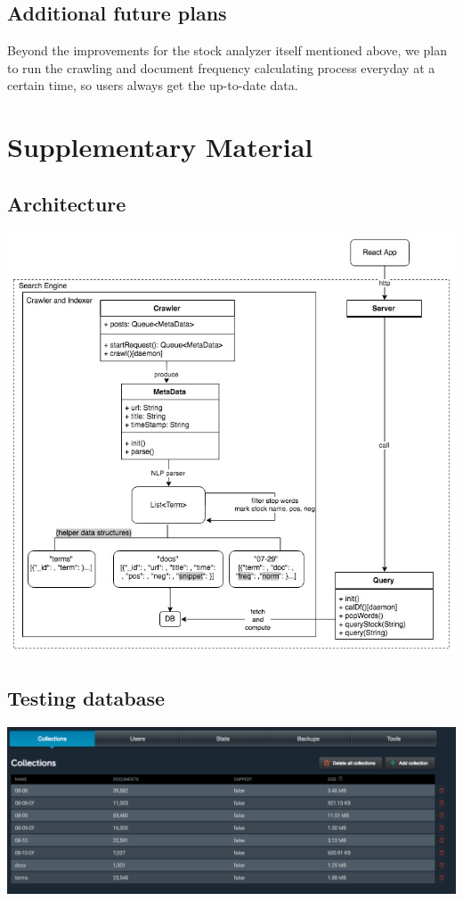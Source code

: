 \documentclass{article}
\begin{document}
\subsection{Additional future plans}
Beyond the improvements for the stock analyzer itself mentioned above, we plan to run the crawling and document frequency calculating process everyday at a certain time, so users always get the up-to-date data.

\section{Supplementary Material}
\subsection{Architecture}
\includegraphics[width=7in]{StockNLP_Pipeline}
\subsection{Testing database}
\includegraphics[width=7in]{Database_summary}
\end{document}
